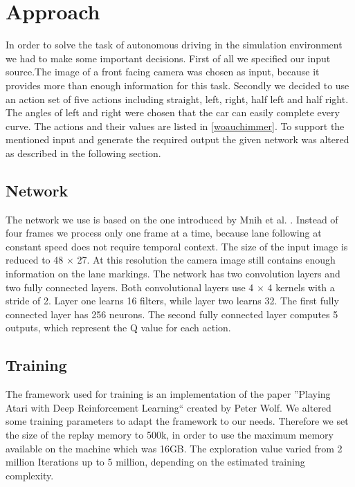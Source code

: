 
\section{Approach}

In order to solve the task of autonomous driving in the simulation environment we had to make some important decisions. First of all we specified our input source.The image of a front facing camera was chosen as input, because it provides more than enough information for this task. Secondly we decided to use an action set of five actions including straight, left, right, half left and half right. The angles of left and right were chosen that the car can easily complete every curve. The actions and their values are listed in \ref{woauchimmer}. To support the mentioned input and generate the required output the given network was altered as described in the following section.

\subsection{Network}
The network we use is based on the one introduced by Mnih et al. \cite{Mnih13}. Instead of four frames we process only one frame at a time, because lane following at constant speed does not require temporal context. The size of the input image is reduced to 48 $\times$ 27. At this resolution the camera image still contains enough information on the lane markings. The network has two convolution layers and two fully connected layers. Both convolutional layers use 4 $\times$ 4 kernels with a stride of 2. Layer one learns 16 filters, while layer two learns 32. The first fully connected layer has 256 neurons. The second fully connected layer computes 5 outputs, which represent the Q value for each action.


\subsection{Training}
The framework used for training is an implementation of the paper ''Playing Atari with Deep Reinforcement Learning``  created by Peter Wolf. We altered some training parameters to adapt the framework to our needs. Therefore we set the size of the replay memory to 500k, in order to use the maximum memory available on the machine which was 16GB. The exploration value varied from 2 million Iterations up to 5 million, depending on the estimated training complexity. 

